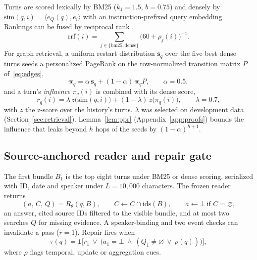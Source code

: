 \documentclass[10pt]{article}
\theoremstyle{plain}
\theoremstyle{definition}
\begin{document}
Turns are scored lexically by BM25 ($k_1{=}1.5$, $b{=}0.75$) and densely by
$\mathrm{sim}(q,i)=\langle e_Q(q),e_i\rangle$ with an instruction-prefixed query embedding. Rankings can be
fused by reciprocal rank \citep{cormack2009rrf},
\begin{equation}
\mathrm{rrf}(i)=\sum_{j\in\{\mathrm{bm25},\mathrm{dense}\}}\big(60+\rho_j(i)\big)^{-1}.
\label{eq:rrf}
\end{equation}
For graph retrieval, a uniform restart distribution $\mathbf{s}_q$ over the five best dense turns seeds a
personalized PageRank on the row-normalized transition matrix $P$ of~\eqref{eq:edges},
\begin{equation}
\boldsymbol\pi_q=\alpha\,\mathbf{s}_q+(1-\alpha)\,\boldsymbol\pi_q P,\qquad \alpha=0.5,
\label{eq:ppr}
\end{equation}
and a turn's \emph{influence} $\pi_q(i)$ is combined with its dense score,
\begin{equation}
r_q(i)=\lambda\, z\big(\mathrm{sim}(q,i)\big)+(1-\lambda)\,z\big(\pi_q(i)\big),\qquad \lambda=0.7,
\label{eq:mix}
\end{equation}
with $z$ the z-score over the history's turns. $\lambda$ was selected on development data
(Section~\ref{sec:retrieval}). Lemma~\ref{lem:ppr} (Appendix~\ref{app:proofs}) bounds the influence that
leaks beyond $h$ hops of the seeds by $(1-\alpha)^{h+1}$.

\subsection{Source-anchored reader and repair gate}

The first bundle $B_1$ is the top eight turns under BM25 or dense scoring, serialized with ID, date and
speaker under $L=10{,}000$ characters. The frozen reader returns
\begin{equation}
(a,\,C,\,Q)=R_\theta(q,B),\qquad C\leftarrow C\cap\mathrm{ids}(B),\qquad a\leftarrow\bot\ \text{if } C=\varnothing,
\label{eq:reader}
\end{equation}
an answer, cited source IDs filtered to the visible bundle, and at most two searches $Q$ for missing
evidence. A speaker-binding and two event checks can invalidate a pass ($r=1$). Repair fires when
\begin{equation}
\tau(q)=\mathbf{1}\big[r_1\ \lor\ \big(a_1=\bot\ \land\ (Q_1\neq\varnothing\ \lor\ \rho(q))\big)\big],
\label{eq:gate}
\end{equation}
where $\rho$ flags temporal, update or aggregation cues.
\end{document}
